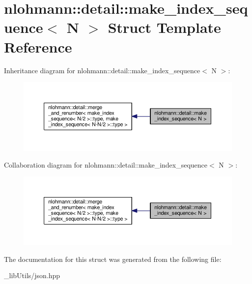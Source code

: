 \hypertarget{structnlohmann_1_1detail_1_1make__index__sequence}{}\section{nlohmann\+:\+:detail\+:\+:make\+\_\+index\+\_\+sequence$<$ N $>$ Struct Template Reference}
\label{structnlohmann_1_1detail_1_1make__index__sequence}


Inheritance diagram for nlohmann\+:\+:detail\+:\+:make\+\_\+index\+\_\+sequence$<$ N $>$\+:\nopagebreak
\begin{figure}[H]
\begin{center}
\leavevmode
\includegraphics[width=350pt]{structnlohmann_1_1detail_1_1make__index__sequence__inherit__graph}
\end{center}
\end{figure}


Collaboration diagram for nlohmann\+:\+:detail\+:\+:make\+\_\+index\+\_\+sequence$<$ N $>$\+:\nopagebreak
\begin{figure}[H]
\begin{center}
\leavevmode
\includegraphics[width=350pt]{structnlohmann_1_1detail_1_1make__index__sequence__coll__graph}
\end{center}
\end{figure}


The documentation for this struct was generated from the following file\+:\begin{DoxyCompactItemize}
\item 
\+\_\+lib\+Utils/json.\+hpp\end{DoxyCompactItemize}

